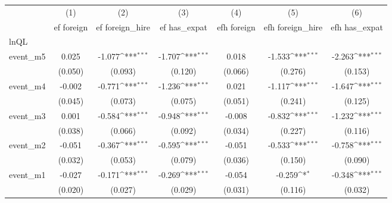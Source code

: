 {
\def\sym#1{\ifmmode^{#1}\else\(^{#1}\)\fi}
\begin{tabular}{l*{6}{c}}
\hline\hline
            &\multicolumn{1}{c}{(1)}&\multicolumn{1}{c}{(2)}&\multicolumn{1}{c}{(3)}&\multicolumn{1}{c}{(4)}&\multicolumn{1}{c}{(5)}&\multicolumn{1}{c}{(6)}\\
            &\multicolumn{1}{c}{ef foreign}&\multicolumn{1}{c}{ef foreign\_hire}&\multicolumn{1}{c}{ef has\_expat}&\multicolumn{1}{c}{efh foreign}&\multicolumn{1}{c}{efh foreign\_hire}&\multicolumn{1}{c}{efh has\_expat}\\
\hline
lnQL        &                     &                     &                     &                     &                     &                     \\
event\_m5    &       0.025         &      -1.077\sym{***}&      -1.707\sym{***}&       0.018         &      -1.533\sym{***}&      -2.263\sym{***}\\
            &     (0.050)         &     (0.093)         &     (0.120)         &     (0.066)         &     (0.276)         &     (0.153)         \\
[1em]
event\_m4    &      -0.002         &      -0.771\sym{***}&      -1.236\sym{***}&       0.021         &      -1.117\sym{***}&      -1.647\sym{***}\\
            &     (0.045)         &     (0.073)         &     (0.075)         &     (0.051)         &     (0.241)         &     (0.125)         \\
[1em]
event\_m3    &       0.001         &      -0.584\sym{***}&      -0.948\sym{***}&      -0.008         &      -0.832\sym{***}&      -1.232\sym{***}\\
            &     (0.038)         &     (0.066)         &     (0.092)         &     (0.034)         &     (0.227)         &     (0.116)         \\
[1em]
event\_m2    &      -0.051         &      -0.367\sym{***}&      -0.595\sym{***}&      -0.051         &      -0.533\sym{***}&      -0.758\sym{***}\\
            &     (0.032)         &     (0.053)         &     (0.079)         &     (0.036)         &     (0.150)         &     (0.090)         \\
[1em]
event\_m1    &      -0.027         &      -0.171\sym{***}&      -0.269\sym{***}&      -0.054         &      -0.259\sym{*}  &      -0.348\sym{***}\\
            &     (0.020)         &     (0.027)         &     (0.029)         &     (0.031)         &     (0.116)         &     (0.032)         \\

\end{tabular}}
